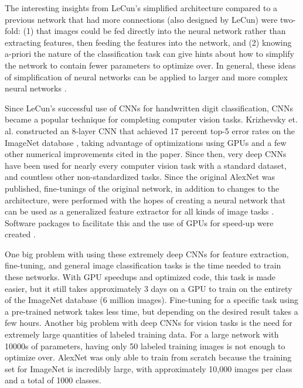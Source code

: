 \documentclass[10pt]{article}
\begin{document}
The interesting insights from LeCun's simplified architecture \cite{lecun_handwritten_1990} compared to a previous network that had more connections (also designed by LeCun) \cite{lecun_backpropagation_1989} were two-fold: (1) that images could be fed directly into the neural network rather than extracting features, then feeding the features into the network, and (2) knowing a-priori the nature of the classification task can give hints about how to simplify the network to contain fewer parameters to optimize over. In general, these ideas of simplification of neural networks can be applied to larger and more complex neural networks \cite{lecun_optimal_1989}. 

Since LeCun's successful use of CNNs for handwritten digit classification, CNNs became a popular technique for completing computer vision tasks. Krizhevsky et. al. \cite{krizhevsky_imagenet_2012} constructed an 8-layer CNN that achieved 17 percent top-5 error rates on the ImageNet database \cite{russakovsky_imagenet_2014}, taking advantage of optimizations using GPUs and a few other numerical improvements cited in the paper. Since then, very deep CNNs have been used for nearly every computer vision task with a standard dataset, and countless other non-standardized tasks. Since the original AlexNet was published, fine-tunings of the original network, in addition to changes to the architecture, were performed with the hopes of creating a neural network that can be used as a generalized feature extractor for all kinds of image tasks \cite{donahue_decaf:_2014}. Software packages to facilitate this and the use of GPUs for speed-up were created \cite{jia_caffe:_2014}. 

One big problem with using these extremely deep CNNs for feature extraction, fine-tuning, and general image classification tasks is the time needed to train these networks. With GPU speedups and optimized code, this task is made easier, but it still takes approximately 3 days on a GPU to train on the entirety of the ImageNet database (6 million images). Fine-tuning for a specific task using a pre-trained network takes less time, but depending on the desired result takes a few hours. Another big problem with deep CNNs for vision tasks is the need for extremely large quantities of labeled training data. For a large network with 10000s of parameters, having only 50 labeled training images is not enough to optimize over. AlexNet was only able to train from scratch because the training set for ImageNet is incredibly large, with approximately 10,000 images per class and a total of 1000 classes. 
\end{document}
